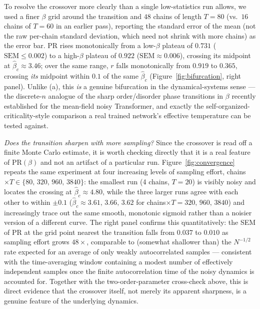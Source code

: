 \documentclass[11pt]{article}
\begin{document}
To resolve the crossover more clearly than a single low-statistics run allows, we used a finer $\beta$ grid around the transition and $48$ chains of length $T=80$ (vs.\ $16$ chains of $T=60$ in an earlier pass), reporting the standard error of the mean (not the raw per-chain standard deviation, which need not shrink with more chains) as the error bar. PR rises monotonically from a low-$\beta$ plateau of $0.731$ ($\mathrm{SEM}\le0.002$) to a high-$\beta$ plateau of $0.922$ ($\mathrm{SEM}\approx0.006$), crossing its midpoint at $\hat\beta_c\approx3.46$; over the same range, $r$ falls monotonically from $0.919$ to $0.365$, crossing \emph{its} midpoint within $0.1$ of the same $\hat\beta_c$ (Figure~\ref{fig:bifurcation}, right panel). Unlike (a), this \emph{is} a genuine bifurcation in the dynamical-systems sense --- the discrete-$n$ analogue of the sharp order/disorder phase transitions in $\beta$ recently established for the mean-field noisy Transformer, and exactly the self-organized-criticality-style comparison a real trained network's effective temperature can be tested against.

\emph{Does the transition sharpen with more sampling?} Since the crossover is read off a finite Monte Carlo estimate, it is worth checking directly that it is a real feature of $\mathrm{PR}(\beta)$ and not an artifact of a particular run. Figure~\ref{fig:convergence} repeats the same experiment at four increasing levels of sampling effort, chains$\times T \in\{80,\,320,\,960,\,3840\}$: the smallest run (4 chains, $T=20$) is visibly noisy and locates the crossing at $\hat\beta_c\approx4.80$, while the three larger runs agree with each other to within $\pm0.1$ ($\hat\beta_c\approx3.61,\,3.66,\,3.62$ for chains$\times T=320,\,960,\,3840$) and increasingly trace out the same smooth, monotonic sigmoid rather than a noisier version of a different curve. The right panel confirms this quantitatively: the SEM of $\mathrm{PR}$ at the grid point nearest the transition falls from $0.037$ to $0.010$ as sampling effort grows $48\times$, comparable to (somewhat shallower than) the $N^{-1/2}$ rate expected for an average of only weakly autocorrelated samples --- consistent with the time-averaging window containing a modest number of effectively independent samples once the finite autocorrelation time of the noisy dynamics is accounted for. Together with the two-order-parameter cross-check above, this is direct evidence that the crossover itself, not merely its apparent sharpness, is a genuine feature of the underlying dynamics.
\end{document}
